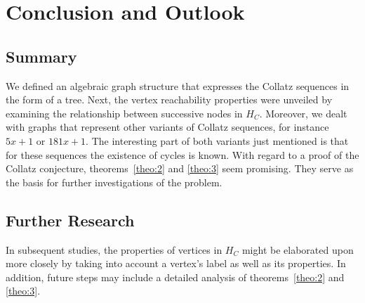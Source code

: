 \chapter{Conclusion and Outlook}

\section{Summary}
We defined an algebraic graph structure that expresses the Collatz sequences in the form of a tree. Next, the vertex reachability properties were unveiled by examining the relationship between successive nodes in $H_C$. Moreover, we dealt with graphs that represent other variants of Collatz sequences, for instance $5x+1$ or $181x+1$. The interesting part of both variants just mentioned is that for these sequences the existence of cycles is known. With regard to a proof of the Collatz conjecture, theorems~\ref{theo:2} and \ref{theo:3} seem promising. They serve as the basis for further investigations of the problem.

\section{Further Research}
In subsequent studies, the properties of vertices in $H_C$ might be elaborated upon more closely by taking into account a vertex's label as well as its properties. In addition, future steps may include a detailed analysis of theorems~\ref{theo:2} and \ref{theo:3}.